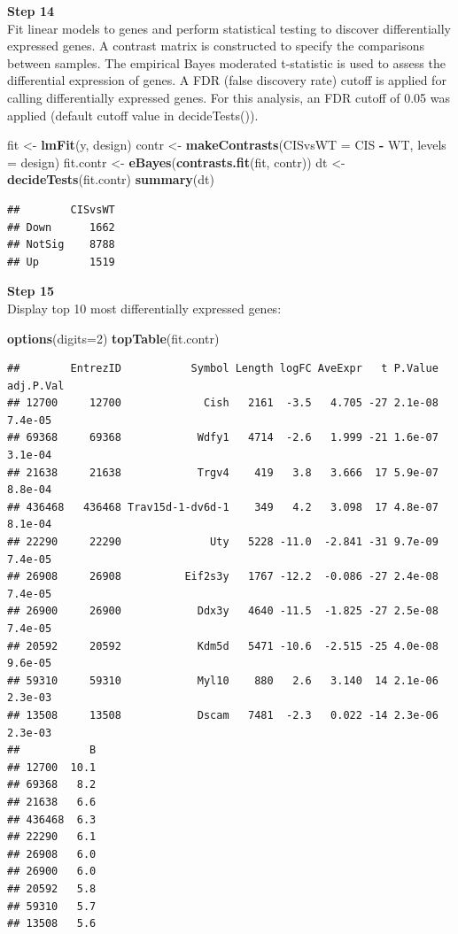 \documentclass[]{book}
\newenvironment{Shaded}{\begin{snugshade}}{\end{snugshade}}
\newcommand{\DataTypeTok}[1]{\textcolor[rgb]{0.13,0.29,0.53}{#1}}
\newcommand{\DecValTok}[1]{\textcolor[rgb]{0.00,0.00,0.81}{#1}}
\newcommand{\KeywordTok}[1]{\textcolor[rgb]{0.13,0.29,0.53}{\textbf{#1}}}
\newcommand{\NormalTok}[1]{#1}
\newcommand{\OperatorTok}[1]{\textcolor[rgb]{0.81,0.36,0.00}{\textbf{#1}}}
\newcommand{\StringTok}[1]{\textcolor[rgb]{0.31,0.60,0.02}{#1}}
\begin{document}
\textbf{Step 14}\\

Fit linear models to genes and perform statistical testing to discover differentially expressed genes. A contrast matrix is constructed to specify the comparisons between samples. The empirical Bayes moderated t-statistic is used to assess the differential expression of genes. A FDR (false discovery rate) cutoff is applied for calling differentially expressed genes. For this analysis, an FDR cutoff of 0.05 was applied (default cutoff value in decideTests()).

\begin{Shaded}
\begin{Highlighting}[]
\NormalTok{fit <-}\StringTok{ }\KeywordTok{lmFit}\NormalTok{(y, design)}
\NormalTok{contr <-}\StringTok{ }\KeywordTok{makeContrasts}\NormalTok{(}\DataTypeTok{CISvsWT =}\NormalTok{ CIS }\OperatorTok{-}\StringTok{ }\NormalTok{WT, }\DataTypeTok{levels =}\NormalTok{ design)}
\NormalTok{fit.contr <-}\StringTok{ }\KeywordTok{eBayes}\NormalTok{(}\KeywordTok{contrasts.fit}\NormalTok{(fit, contr))}
\NormalTok{dt <-}\StringTok{ }\KeywordTok{decideTests}\NormalTok{(fit.contr)}
\KeywordTok{summary}\NormalTok{(dt)}
\end{Highlighting}
\end{Shaded}

\begin{verbatim}
##        CISvsWT
## Down      1662
## NotSig    8788
## Up        1519
\end{verbatim}

\textbf{Step 15}\\

Display top 10 most differentially expressed genes:

\begin{Shaded}
\begin{Highlighting}[]
\KeywordTok{options}\NormalTok{(}\DataTypeTok{digits=}\DecValTok{2}\NormalTok{)}
\KeywordTok{topTable}\NormalTok{(fit.contr)}
\end{Highlighting}
\end{Shaded}

\begin{verbatim}
##        EntrezID           Symbol Length logFC AveExpr   t P.Value adj.P.Val
## 12700     12700             Cish   2161  -3.5   4.705 -27 2.1e-08   7.4e-05
## 69368     69368            Wdfy1   4714  -2.6   1.999 -21 1.6e-07   3.1e-04
## 21638     21638            Trgv4    419   3.8   3.666  17 5.9e-07   8.8e-04
## 436468   436468 Trav15d-1-dv6d-1    349   4.2   3.098  17 4.8e-07   8.1e-04
## 22290     22290              Uty   5228 -11.0  -2.841 -31 9.7e-09   7.4e-05
## 26908     26908          Eif2s3y   1767 -12.2  -0.086 -27 2.4e-08   7.4e-05
## 26900     26900            Ddx3y   4640 -11.5  -1.825 -27 2.5e-08   7.4e-05
## 20592     20592            Kdm5d   5471 -10.6  -2.515 -25 4.0e-08   9.6e-05
## 59310     59310            Myl10    880   2.6   3.140  14 2.1e-06   2.3e-03
## 13508     13508            Dscam   7481  -2.3   0.022 -14 2.3e-06   2.3e-03
##           B
## 12700  10.1
## 69368   8.2
## 21638   6.6
## 436468  6.3
## 22290   6.1
## 26908   6.0
## 26900   6.0
## 20592   5.8
## 59310   5.7
## 13508   5.6
\end{verbatim}
\end{document}
